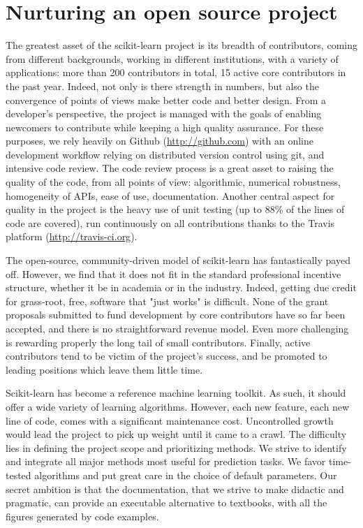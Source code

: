\documentclass[a4paper]{article}
\begin{document}
\section{Nurturing an open source project}

The greatest asset of the scikit-learn project is its breadth of
contributors, coming from different backgrounds, working in different
institutions, with a variety of applications: more than 200 contributors in
total, 15 active core contributors in the past year. Indeed, not only
is there strength in numbers, but also the convergence of points of views
make better code and better design. From a developer's perspective, the
project is managed with the goals of enabling newcomers to
contribute while keeping a high quality assurance. For these purposes, we
rely heavily on Github (\url{http://github.com}) with an online
development workflow relying on distributed version control using git,
and intensive code review. The code review process is a great asset to
raising the quality of the code, from all points of view: algorithmic,
numerical robustness, homogeneity of APIs, ease of use, documentation.
Another central aspect for quality in the project is the heavy use of
unit testing (up to 88\% of the lines of code are covered), run
continuously on all contributions thanks to the Travis platform
(\url{http://travis-ci.org}).

The open-source, community-driven model of scikit-learn has fantastically
payed off. However, we find that it does not fit in the standard
professional incentive structure, whether it be in academia or in the
industry. Indeed, getting due credit for grass-root, free, software that
"just works" is difficult. None of the grant proposals submitted to fund
development by core contributors have so far been accepted, and there is
no straightforward revenue model. Even more challenging is rewarding
properly the long tail of small contributors. Finally, active
contributors tend to be victim of the project's success, and be promoted
to leading positions which leave them little time.

Scikit-learn has become a reference machine learning toolkit. As such, it
should offer a wide variety of learning algorithms. However, each new
feature, each new line of code, comes with a significant maintenance cost.
Uncontrolled growth would lead the project to pick up weight until it
came to a crawl. The difficulty lies in defining the project scope and
prioritizing methods. We strive to identify and integrate all major
methods most useful for prediction tasks. We favor time-tested
algorithms and put great care in the choice of default parameters. Our
secret ambition is that the documentation, that we strive to make
didactic and pragmatic, can provide an executable alternative to
textbooks, with all the figures generated by code examples.




\end{document}
